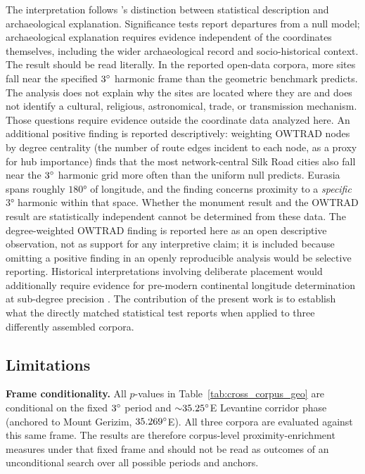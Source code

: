 \documentclass[12pt,a4paper]{article}
\newcommand{\degr}{\ifmmode^\circ\else\textdegree{}\fi}
\begin{document}
The interpretation follows \citet{silva2020statistical}'s distinction
between statistical description and archaeological explanation.
Significance tests report departures from a null model; archaeological
explanation requires evidence independent of the coordinates themselves,
including the wider archaeological record and socio-historical context.
The result should be read literally. In the reported open-data corpora,
more sites fall near the specified $3\degr$ harmonic frame than the
geometric benchmark predicts. The analysis does not explain why the
sites are located where they are and does not identify a cultural,
religious, astronomical, trade, or transmission mechanism. Those
questions require evidence outside the coordinate data analyzed here.
An additional positive finding is reported descriptively: weighting
OWTRAD nodes by degree centrality (the number of route edges incident
to each node, as a proxy for hub importance) finds that the most
network-central Silk Road cities also fall near the $3\degr$ harmonic
grid more often than the uniform null predicts. Eurasia spans roughly
$180°$ of longitude, and the finding concerns proximity to a
\emph{specific} $3°$ harmonic within that space. Whether the monument
result and the OWTRAD result are statistically independent cannot be
determined from these data. The degree-weighted OWTRAD finding is
reported here as an open descriptive observation, not as support for any
interpretive claim; it is included because omitting a positive finding in
an openly reproducible analysis would be selective reporting.
Historical interpretations involving deliberate placement would
additionally require evidence for pre-modern continental longitude
determination at sub-degree precision
\citep{hunger2019mul, neugebauer1975history}. The contribution of the
present work is to establish what the directly matched statistical
test reports when applied to three differently assembled corpora.

\subsection{Limitations}

\noindent\textbf{Frame conditionality.}
All $p$-values in Table~\ref{tab:cross_corpus_geo} are conditional on
the fixed $3\degr$ period and ${\sim}35.25\degr$E Levantine corridor
phase (anchored to Mount Gerizim, $\GerizimLon\degr$E). All three
corpora are evaluated against this same frame. The results are therefore
corpus-level proximity-enrichment measures under that fixed frame and
should not be read as outcomes of an unconditional search over all
possible periods and anchors.
\end{document}
